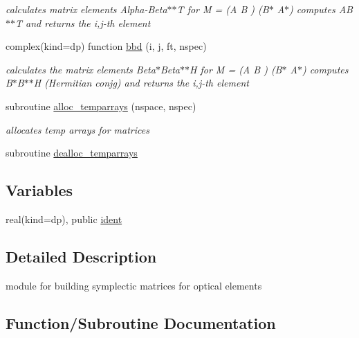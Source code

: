 \begin{DoxyCompactItemize}
\begin{DoxyCompactList}\small\item\em calculates matrix elements Alpha-\/\+Beta$\ast$$\ast$T  for M = (A B ) (B$\ast$ A$\ast$) computes A\+B$\ast$$\ast$T and returns the i,j-\/th element \end{DoxyCompactList}\item 
complex(kind=dp) function \hyperlink{namespacemakeopticalelements_a7d0e54a1c7f830fd961f3c99d0a49b30}{bbd} (i, j, ft, nspec)
\begin{DoxyCompactList}\small\item\em calculates the matrix elements Beta$\ast$\+Beta$\ast$$\ast$H  for M = (A B ) (B$\ast$ A$\ast$) computes B$\ast$\+B$\ast$$\ast$H (Hermitian conjg) and returns the i,j-\/th element \end{DoxyCompactList}\item 
subroutine \hyperlink{namespacemakeopticalelements_aefda61530c80eccf75e7065015af413d}{alloc\+\_\+temparrays} (nspace, nspec)
\begin{DoxyCompactList}\small\item\em allocates temp arrays for matrices \end{DoxyCompactList}\item 
subroutine \hyperlink{namespacemakeopticalelements_aab212aad9e53b7ae643456f9bc0b68cb}{dealloc\+\_\+temparrays}
\end{DoxyCompactItemize}
\subsection*{Variables}
\begin{DoxyCompactItemize}
\item 
real(kind=dp), public \hyperlink{namespacemakeopticalelements_ab4e48a98a0fb0756bb4eff6ece9623a8}{ident}
\end{DoxyCompactItemize}


\subsection{Detailed Description}
module for building symplectic matrices for optical elements 

\subsection{Function/\+Subroutine Documentation}
